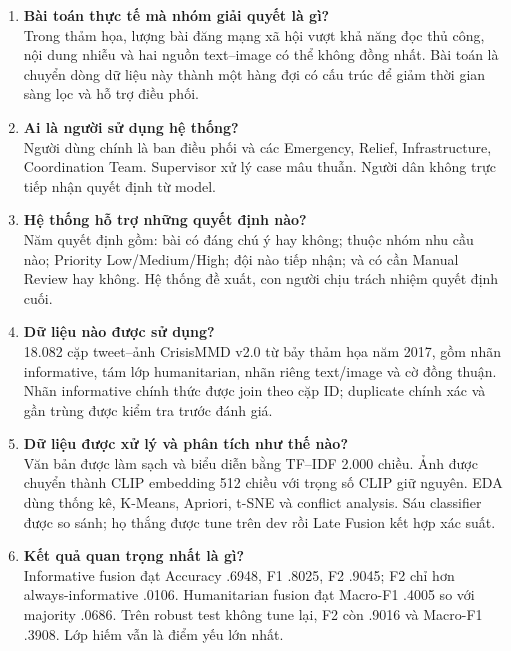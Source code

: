 \begin{enumerate}[leftmargin=*]
  \item \textbf{Bài toán thực tế mà nhóm giải quyết là gì?}\\
        Trong thảm họa, lượng bài đăng mạng xã hội vượt khả năng đọc thủ công,
        nội dung nhiễu và hai nguồn text--image có thể không đồng nhất. Bài toán
        là chuyển dòng dữ liệu này thành một hàng đợi có cấu trúc để giảm thời
        gian sàng lọc và hỗ trợ điều phối.

  \item \textbf{Ai là người sử dụng hệ thống?}\\
        Người dùng chính là ban điều phối và các Emergency, Relief,
        Infrastructure, Coordination Team. Supervisor xử lý case mâu thuẫn.
        Người dân không trực tiếp nhận quyết định từ model.

  \item \textbf{Hệ thống hỗ trợ những quyết định nào?}\\
        Năm quyết định gồm: bài có đáng chú ý hay không; thuộc nhóm nhu cầu nào;
        Priority Low/Medium/High; đội nào tiếp nhận; và có cần Manual Review hay
        không. Hệ thống đề xuất, con người chịu trách nhiệm quyết định cuối.

  \item \textbf{Dữ liệu nào được sử dụng?}\\
        18.082 cặp tweet--ảnh CrisisMMD v2.0 từ bảy thảm họa năm 2017, gồm nhãn
        informative, tám lớp humanitarian, nhãn riêng text/image và cờ đồng
        thuận. Nhãn informative chính thức được join theo cặp ID; duplicate
        chính xác và gần trùng được kiểm tra trước đánh giá.

  \item \textbf{Dữ liệu được xử lý và phân tích như thế nào?}\\
        Văn bản được làm sạch và biểu diễn bằng TF--IDF 2.000 chiều. Ảnh được
        chuyển thành CLIP embedding 512 chiều với trọng số CLIP giữ nguyên.
        EDA dùng thống kê, K-Means, Apriori, t-SNE và conflict analysis. Sáu
        classifier được so sánh; họ thắng được tune trên dev rồi Late Fusion
        kết hợp xác suất.

  \item \textbf{Kết quả quan trọng nhất là gì?}\\
        Informative fusion đạt Accuracy .6948, F1 .8025, F2 .9045; F2 chỉ hơn
        always-informative .0106. Humanitarian fusion đạt Macro-F1 .4005 so với
        majority .0686. Trên robust test không tune lại, F2 còn .9016 và
        Macro-F1 .3908. Lớp hiếm vẫn là điểm yếu lớn nhất.


\end{enumerate}
